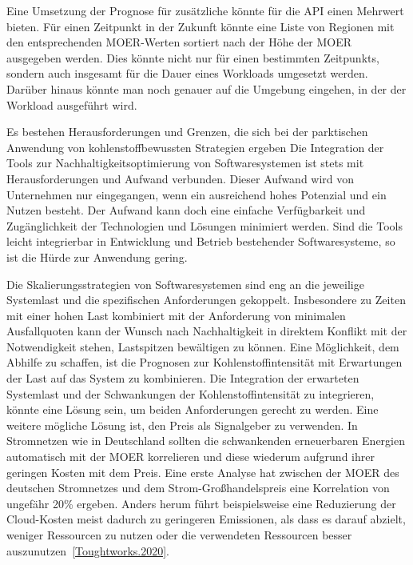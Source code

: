 Eine Umsetzung der Prognose für zusätzliche könnte für die \ac{API} einen Mehrwert bieten.
Für einen Zeitpunkt in der Zukunft könnte eine Liste von Regionen mit den entsprechenden \ac{MOER}-Werten sortiert nach der Höhe der \ac{MOER} ausgegeben werden.
Dies könnte nicht nur für einen bestimmten Zeitpunkts, sondern auch insgesamt für die Dauer eines Workloads umgesetzt werden.
Darüber hinaus könnte man noch genauer auf die Umgebung eingehen, in der der Workload ausgeführt wird.

Es bestehen Herausforderungen und Grenzen, die sich bei der parktischen Anwendung von kohlenstoffbewussten Strategien ergeben
Die Integration der Tools zur Nachhaltigkeitsoptimierung von Softwaresystemen ist stets mit Herausforderungen und Aufwand verbunden.
Dieser Aufwand wird von Unternehmen nur eingegangen, wenn ein ausreichend hohes Potenzial und ein Nutzen besteht.
Der Aufwand kann doch eine einfache Verfügbarkeit und Zugänglichkeit der Technologien und Lösungen minimiert werden.
Sind die Tools leicht integrierbar in Entwicklung und Betrieb bestehender Softwaresysteme, so ist die Hürde zur Anwendung gering.

Die Skalierungsstrategien von Softwaresystemen sind eng an die jeweilige Systemlast und die spezifischen Anforderungen gekoppelt.
Insbesondere zu Zeiten mit einer hohen Last kombiniert mit der Anforderung von minimalen Ausfallquoten kann der Wunsch nach Nachhaltigkeit in direktem Konflikt mit der Notwendigkeit stehen, Lastspitzen bewältigen zu können.
Eine Möglichkeit, dem Abhilfe zu schaffen, ist die Prognosen zur Kohlenstoffintensität mit Erwartungen der Last auf das System zu kombinieren.
Die Integration der erwarteten Systemlast und der Schwankungen der Kohlenstoffintensität zu integrieren, könnte eine Lösung sein, um beiden Anforderungen gerecht zu werden.
Eine weitere mögliche Lösung ist, den Preis als Signalgeber zu verwenden.
In Stromnetzen wie in Deutschland sollten die schwankenden erneuerbaren Energien automatisch mit der \ac{MOER} korrelieren und diese wiederum aufgrund ihrer geringen Kosten mit dem Preis.
Eine erste Analyse hat zwischen der \ac{MOER} des deutschen Stromnetzes und dem Strom-Großhandelspreis eine Korrelation von ungefähr 20\% ergeben.
Anders herum führt beispielsweise eine Reduzierung der Cloud-Kosten meist dadurch zu geringeren Emissionen, als dass es darauf abzielt, weniger Ressourcen zu nutzen oder die verwendeten Ressourcen besser auszunutzen~\ref{Toughtworks.2020}.

